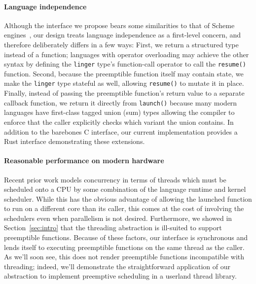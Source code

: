 \paragraph{Language independence}
Although the interface we propose bears some similarities to that of Scheme
engines~\cite{haynes:iucs1984}, our design treats language independence as a
first-level concern, and therefore deliberately differs in a few ways:  First, we
return a structured type instead of a function; languages with operator overloading
may achieve the other syntax by defining the \texttt{linger} type's function-call
operator to call the \texttt{resume()} function.  Second, because the preemptible
function itself may contain state, we make the \texttt{linger} type stateful as well,
allowing \texttt{resume()} to mutate it in place.  Finally, instead of passing the
preemptible function's return value to a separate callback function, we return it
directly from \texttt{launch()} because many modern languages have first-class tagged
union (sum) types allowing the compiler to enforce that the caller explicitly checks
which variant the union contains.  In addition to the barebones C interface, our
current implementation provides a Rust interface demonstrating these extensions.

\paragraph{Reasonable performance on modern hardware}
Recent prior work models concurrency in terms of threads which must be scheduled onto
a CPU by some combination of the language runtime and kernel scheduler.  While this
has the obvious advantage of allowing the launched function to run on a different
core than its caller, this comes at the cost of involving the schedulers even when
parallelism is not desired.  Furthermore, we showed in Section~\ref{sec:intro} that
the threading abstraction is ill-suited to support preemptible functions.  Because of
these factors, our interface is synchronous and lends itself to executing preemptible
functions on the same thread as the caller.  As we'll soon see, this does not render
preemptible functions incompatible with threading; indeed, we'll demonstrate the
straightforward application of our abstraction to implement preemptive scheduling in
a userland thread library.

